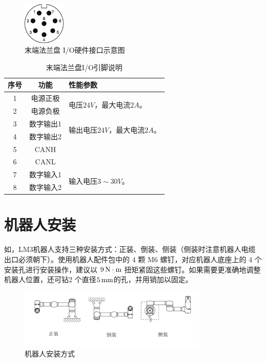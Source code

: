 \begin{enumerate}
\begin{figure}[ht]
    \centering
    \includegraphics[height=2cm]{image/35.pdf}
    \caption{末端法兰盘 I/O硬件接口示意图}
    \label{fig:法兰盘IO}
\end{figure}

\begin{table}[ht]
    \centering\small
\begin{tabular}{|c|c|l|}\hline
   \bf 序号	&  \bf 功能	& \bf  性能参数\\\hline
    1	&   电源正极   &  \multirow{2}{5cm}{
            电压$24\unit{V}$，最大电流$2\unit{A}$。
    }\\\cline{1-2}
    2	&   电源负极 & \\\hline
    3	&   数字输出1	&   \multirow{2}{5cm}{输出电压$24\unit{V}$，最大电流$2\unit{A}$。}\\\cline{1-2}
    4	&   数字输出2	&   \\\hline
    5	&   CANH	&   \\\hline
    6	&   CANL	&   \\\hline
    7	&   数字输入1	&   \multirow{2}{5cm}{
            输入电压$3\sim 30\unit{V}$。
    }\\\cline{1-2}
    8	&   数字输入2	&   \\\hline
\end{tabular}
\caption{末端法兰盘I/O引脚说明}
\label{tab:法兰盘IO}
\end{table}

\end{enumerate}

\section{机器人安装}

如，LM3机器人支持三种安装方式：正装、倒装、侧装（侧装时注意机器人电缆出口必须朝下）。使用机器人配件包中的 4 颗 M6 螺钉，对应机器人底座上的 4 个安装孔进行安装操作，建议以 $9\,\mathrm{N\cdot m}$ 扭矩紧固这些螺钉。如果需要更准确地调整机器人位置，还可钻2 个直径$5 \,\mathrm{mm}$的孔，并用销加以固定。

\begin{figure}[ht]
    \centering
    \includegraphics[width=\textwidth]{image/1-4-dir-new.png}
    \caption{机器人安装方式}
    \label{fig:机器人安装方式}
\end{figure}

